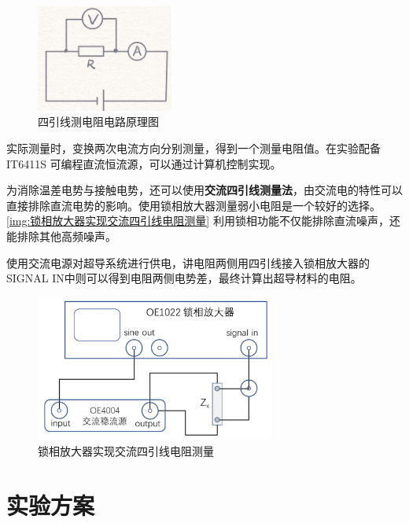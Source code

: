 \documentclass{spaexp}
\begin{document}
            \begin{figure}
                \ct
                \caption{四引线测电阻电路原理图}
                \label{img:四引线测电阻电路原理图}
                \includegraphics[width = 0.4\textwidth]{fourfoot.jpeg}
            \end{figure}

            实际测量时，变换两次电流方向分别测量，得到一个测量电阻值。在实验配备 IT6411S 可编程直流恒流源，可以通过计算机控制实现。\par

            为消除温差电势与接触电势，还可以使用{\bf{交流四引线测量法}}，由交流电的特性可以直接排除直流电势的影响。使用锁相放大器测量弱小电阻是一个较好的选择。\autoref{img:锁相放大器实现交流四引线电阻测量}
            利用锁相功能不仅能排除直流噪声，还能排除其他高频噪声。\par

            使用交流电源对超导系统进行供电，讲电阻两侧用四引线接入锁相放大器的SIGNAL IN中则可以得到电阻两侧电势差，最终计算出超导材料的电阻。
            \begin{figure}
                \ct
                \caption{锁相放大器实现交流四引线电阻测量}
                \label{img:锁相放大器实现交流四引线电阻测量}
                \includegraphics[width = 0.7\textwidth]{dcfourfoot.png}
            \end{figure}

            
    
    \section{实验方案}
\end{document}
